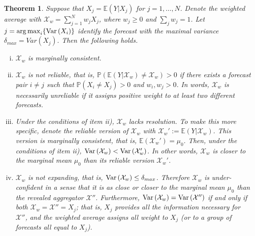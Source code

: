 \documentclass[11pt]{article}
\renewcommand{\P}{\mathbb{P}}
\newcommand{\E}{\mathbb{E}}
\newtheorem{theorem}{Theorem}[section]
\DeclareMathOperator*{\argmax}{arg\,max}
\theoremstyle{definition}
\theoremstyle{definition}
\def\P{{\mathbb P}}
\def\E{{\mathbb E}}
\def\Var{{\rm Var}\,}
\begin{document}
\begin{theorem}\label{contraction}
Suppose that $X_j = \E(Y | X_j)$ for $j = 1, \dots, N$. Denote the weighted average with $\mathcal{X}_w = \sum_{j=1}^N w_jX_j$, where  $w_j \geq 0$ and $\sum_j w_j = 1$.  Let $j = \argmax_i \{ \Var(X_i)  \}$ identify the forecast with the maximal variance $\delta_{max} = Var(X_j)$. Then the following holds.
\begin{enumerate}[i)]
\item  $\mathcal{X}_w$ is marginally consistent.
\item $\mathcal{X}_w$ is not reliable, that is, $\P\left(\E(Y | \mathcal{X}_w) \neq \mathcal{X}_w\right) > 0$ if there exists a forecast pair $i \neq j$ such that $\P(X_i \neq X_j) > 0$ and $w_i, w_j > 0$. In words, $\mathcal{X}_w$ is necessarily unreliable if it assigns positive weight to at least two different forecasts. 
 
 \item Under the conditions of item ii), $\mathcal{X}_w$ lacks resolution. To make this more specific, denote the reliable version of $\mathcal{X}_w$ with $\mathcal{X}_w' :=  \E(Y| \mathcal{X}_w)$. This version is marginally consistent, that is, $\E(\mathcal{X}_w') = \mu_0$. Then, under the conditions of item ii), $\Var(\mathcal{X}_w) < \Var(\mathcal{X}_w')$. In other words, $\mathcal{X}_w$ is closer to the marginal mean $\mu_0$ than its reliable version $\mathcal{X}_w'$. \label{underconfA}
 
\item $\mathcal{X}_w$ is not expanding, that is, $\Var(\mathcal{X}_w) \leq \delta_{max}$. Therefore $\mathcal{X}_w$ is under-confident in a sense that it is as close or closer to the marginal mean $\mu_0$ than the revealed aggregator $\mathcal{X}''$.  Furthermore, $\Var(\mathcal{X}_w) = \Var(\mathcal{X}'')$ if and only if both $\mathcal{X}_w = \mathcal{X}'' = X_j$; that is,  $X_j$ provides all the information necessary for $\mathcal{X}''$, and the weighted average assigns all weight to $X_j$ (or to a group of forecasts all equal to $X_j$). \label{underconfB}
\end{enumerate}
\end{theorem}
\end{document}

